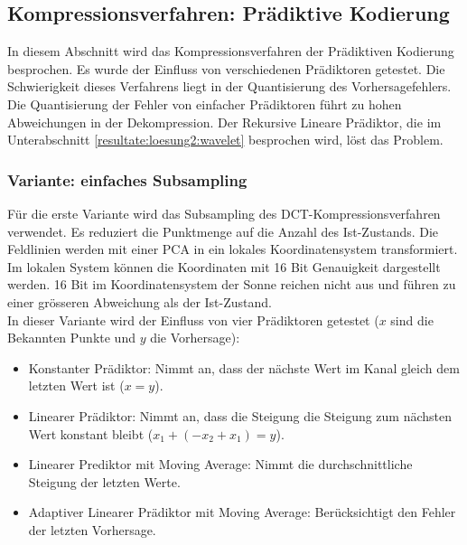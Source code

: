 \subsection{Kompressionsverfahren: Prädiktive Kodierung}  \label{resultate:loesung2}
In diesem Abschnitt wird das Kompressionsverfahren der Prädiktiven Kodierung besprochen. Es wurde der Einfluss von verschiedenen Prädiktoren getestet. Die Schwierigkeit dieses Verfahrens liegt in der Quantisierung des Vorhersagefehlers. Die Quantisierung der Fehler von einfacher Prädiktoren führt zu hohen Abweichungen in der Dekompression. Der Rekursive Lineare Prädiktor, die im Unterabschnitt \ref{resultate:loesung2:wavelet} besprochen wird, löst das Problem.

\subsubsection{Variante: einfaches Subsampling}
Für die erste Variante wird das Subsampling des DCT-Kompressionsverfahren verwendet. Es reduziert die Punktmenge auf die Anzahl des Ist-Zustands. Die Feldlinien werden mit einer PCA in ein lokales Koordinatensystem transformiert. Im lokalen System können die Koordinaten mit 16 Bit Genauigkeit dargestellt werden. 16 Bit im Koordinatensystem der Sonne reichen nicht aus und führen zu einer grösseren Abweichung als der Ist-Zustand.\\
In dieser Variante wird der Einfluss von vier Prädiktoren getestet ($x$ sind die Bekannten Punkte und $y$ die Vorhersage):
\begin{itemize}
\item Konstanter Prädiktor: Nimmt an, dass der nächste Wert im Kanal gleich dem  letzten Wert ist ($x = y$).
\item Linearer Prädiktor: Nimmt an, dass die Steigung die Steigung zum nächsten Wert konstant bleibt ($x_1+(-x_2+x_1) = y$).
\item Linearer Prediktor mit Moving Average: Nimmt die durchschnittliche Steigung der letzten Werte.
\item Adaptiver Linearer Prädiktor mit Moving Average: Berücksichtigt den Fehler der letzten Vorhersage.
\end{itemize}

